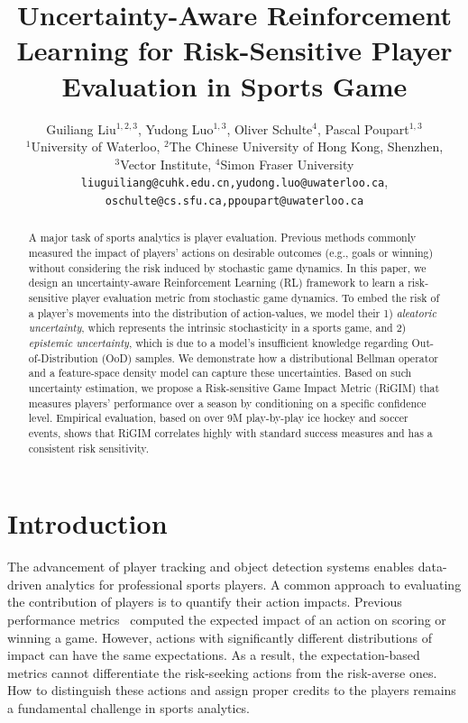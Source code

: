 \documentclass{article}
\title{Uncertainty-Aware Reinforcement Learning for Risk-Sensitive Player Evaluation in Sports Game}
\author{
Guiliang Liu$^{1,2,3}$, Yudong Luo$^{1,3}$, Oliver Schulte$^{4}$, Pascal Poupart$^{1,3}$ \\
${^1}$University of Waterloo, ${^2}$The Chinese
University of Hong Kong, Shenzhen,\\ 
${^3}$Vector Institute,
${^4}$Simon Fraser University\\
\texttt{liuguiliang@cuhk.edu.cn,yudong.luo@uwaterloo.ca},\\
\texttt{oschulte@cs.sfu.ca,ppoupart@uwaterloo.ca}
}
\begin{document}
\maketitle
\begin{abstract}
A major task of sports analytics is player evaluation. Previous methods commonly measured the impact of players' actions on desirable outcomes (e.g., goals or winning) without considering the risk induced by stochastic game dynamics.  In this paper, we design an uncertainty-aware Reinforcement Learning (RL) framework to learn a risk-sensitive player evaluation metric from stochastic game dynamics. To embed the risk of a player’s movements into the distribution of action-values, we model their 1) {\it aleatoric uncertainty}, which represents the intrinsic stochasticity in a sports game, and 2) {\it epistemic uncertainty}, which is due to a model's insufficient knowledge regarding Out-of-Distribution (OoD) samples. We demonstrate how a distributional Bellman operator and a feature-space density model can capture these uncertainties. Based on such uncertainty estimation, we propose a Risk-sensitive Game Impact Metric (RiGIM) that measures players' performance over a season by conditioning on a specific confidence level. Empirical evaluation, based on over 9M play-by-play ice hockey and soccer events, shows that RiGIM correlates highly with standard success measures and has a consistent risk sensitivity.
\end{abstract}
\section{Introduction}
The advancement of player tracking and object detection systems enables data-driven analytics for professional sports players. A common approach to evaluating the contribution of players is to quantify their action impacts.  Previous performance metrics~\cite{Routley2015Markov,Liu2018DRL,Decroos2019Actions,Luo2020IRL} computed the expected impact of an action on scoring or winning a game. However, actions with significantly different distributions of impact can have the same expectations. As a result, the expectation-based metrics cannot differentiate the risk-seeking actions from the risk-averse ones. How to distinguish these actions and assign proper credits to the players remains a fundamental challenge in sports analytics.
\end{document}
